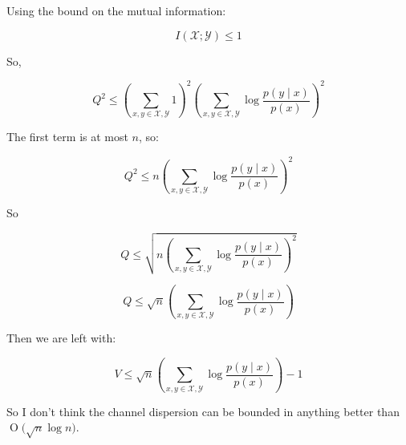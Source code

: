 \documentclass[11pt]{article}
\newcommand{\BigO}[1]{\ensuremath{\operatorname{O}\bigl(#1\bigr)}}
\begin{document}
Using the bound on the mutual information: 

\begin{equation}
I\left(\mathscr{X} ; \mathscr{Y}\right)  \leq 1 
\end{equation}

So, 

\begin{equation}
Q^2 \leq \left( \sum_{x,y \in \mathscr{X}, \mathscr{Y}} 1 \right)^2 \left( \sum_{x,y \in \mathscr{X}, \mathscr{Y}} \log{\frac{p\left(y \mid x\right)}{p\left(x\right)}}\right)^2
\end{equation}

The first term is at most \(n\), so: 

\begin{equation}
Q^2 \leq n \left( \sum_{x,y \in \mathscr{X}, \mathscr{Y}} \log{\frac{p\left(y \mid x\right)}{p\left(x\right)}}\right)^2
\end{equation}

So

\begin{equation}
Q \leq \sqrt{n \left( \sum_{x,y \in \mathscr{X}, \mathscr{Y}} \log{\frac{p\left(y \mid x\right)}{p\left(x\right)}}\right)^2}
\end{equation}

\begin{equation}
Q \leq \sqrt{n} \left( \sum_{x,y \in \mathscr{X}, \mathscr{Y}} \log{\frac{p\left(y \mid x\right)}{p\left(x\right)}}\right)
\end{equation}

Then we are left with:

\begin{equation}
V \leq \sqrt{n} \left( \sum_{x,y \in \mathscr{X}, \mathscr{Y}} \log{\frac{p\left(y \mid x\right)} {p\left(x\right)}}\right) - 1
\end{equation}

So I don't think the channel dispersion can be bounded in anything better than \(\BigO{\sqrt{n}\log{n}}\).
\end{document}
